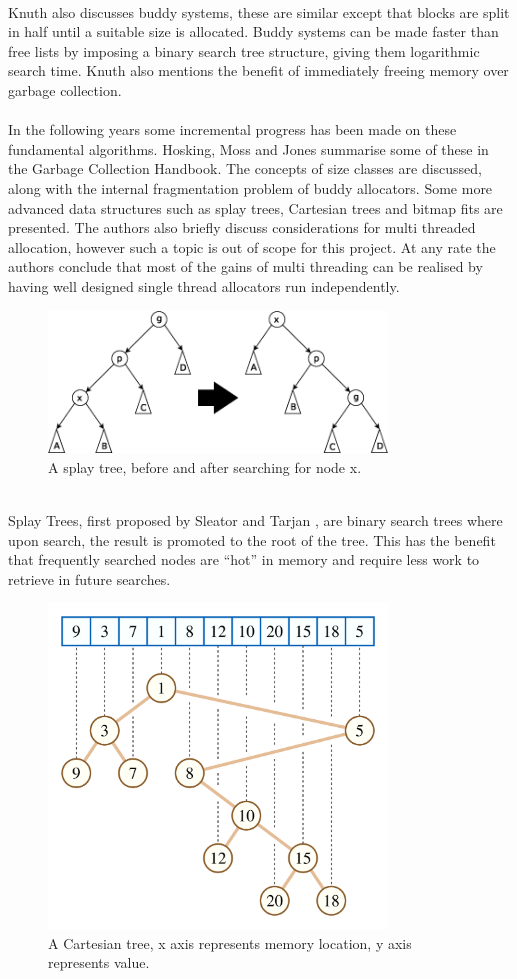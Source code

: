 \documentclass{article}
\begin{document}
\\
Knuth also discusses buddy systems, these are similar except that blocks are split in half until a suitable size is allocated. Buddy systems can be made faster than free lists by imposing a binary search tree structure, giving them logarithmic search time. Knuth also mentions the benefit of immediately freeing memory over garbage collection.\\
\\
In the following years some incremental progress has been made on these fundamental algorithms. Hosking, Moss and Jones \cite{10.5555/2025255} summarise some of these in the Garbage Collection Handbook. The concepts of size classes are discussed, along with the internal fragmentation problem of buddy allocators. Some more advanced data structures such as splay trees, Cartesian trees and bitmap fits are presented. The authors also briefly discuss considerations for multi threaded allocation, however such a topic is out of scope for this project. At any rate the authors conclude that most of the gains of multi threading can be realised by having well designed single thread allocators run independently.\\
\begin{figure}[htbp]
	\centering
	\includegraphics[width=9cm]{splay_tree}
	\captionsetup{width=10cm}
	\caption{A splay tree, before and after searching for node x.}
\end{figure}
\\
Splay Trees, first proposed by Sleator and Tarjan \cite{10.1145/3828.3835}, are binary search trees where upon search, the result is promoted to the root of the tree. This has the benefit that frequently searched nodes are ``hot'' in memory and require less work to retrieve in future searches. 
\pagebreak
\begin{figure}[htbp]
	\centering
	\includegraphics[width=9cm]{Cartesian_tree}
	\captionsetup{width=10cm}
	\caption{A Cartesian tree, x axis represents memory location, y axis represents value.}
\end{figure}
\end{document}
